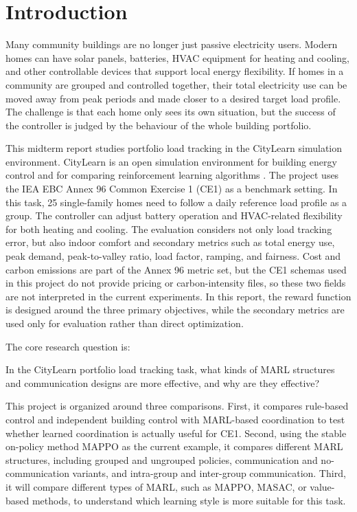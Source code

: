 ﻿\chapter{Introduction}\label{ch:intro}

Many community buildings are no longer just passive electricity users. Modern
homes can have solar panels, batteries, HVAC equipment for heating and cooling,
and other controllable devices that support local energy flexibility.
If homes in a community are grouped and controlled together, their total
electricity use can be moved away from peak periods and made closer to a
desired target load profile. The challenge is that each home only sees its own
situation, but the success of the controller is judged by the behaviour of the
whole building portfolio.

This midterm report studies portfolio load tracking in the CityLearn simulation
environment. CityLearn is an open simulation environment for building energy control and for
comparing reinforcement learning algorithms
\cite{citylearn2019,citylearn2020,citylearnv2}. The project uses the IEA EBC
Annex 96 Common Exercise 1 (CE1) as a benchmark setting. In this
task, 25 single-family homes need to follow a daily reference load profile as a
group. The controller can adjust battery operation and HVAC-related flexibility
for both heating and cooling. The evaluation considers not only load tracking
error, but also indoor comfort and secondary metrics such as total energy use,
peak demand, peak-to-valley ratio, load factor, ramping, and fairness. Cost and
carbon emissions are part of the Annex 96 metric set, but the CE1 schemas used
in this project do not provide pricing or carbon-intensity files, so these two
fields are not interpreted in the current experiments. In this report, the
reward function is designed around the three primary objectives, while the
secondary metrics are used only for evaluation rather than direct optimization.

The core research question is:

In the CityLearn portfolio load tracking task, what kinds of MARL
structures and communication designs are more effective, and why are they
effective?

This project is organized around three comparisons. First, it compares
rule-based control and independent building control with MARL-based coordination
to test whether learned coordination is actually useful for CE1. Second, using
the stable on-policy method MAPPO as the current example, it compares different
MARL structures, including grouped and ungrouped policies, communication and
no-communication variants, and intra-group and inter-group communication. Third,
it will compare different types of MARL, such as MAPPO, MASAC, or value-based
methods, to understand which learning style is more suitable for this task.


